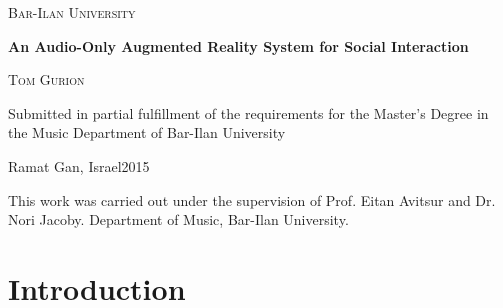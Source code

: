\documentclass[a4paper,11pt]{article}
\begin{document}

\begin{titlepage}
	\centering
	{\LARGE\scshape Bar-Ilan University\par}
	\vspace{2cm}
	{\LARGE\bfseries An Audio-Only Augmented Reality System for Social Interaction\par}
  \vspace{2cm}
  {\large\scshape Tom Gurion\par}
  \vspace{2cm}
	Submitted in partial fulfillment of the requirements for the Master's Degree in the Music Department of Bar-Ilan University\par
	\vfill  %
	Ramat Gan, Israel\hfill 2015
\end{titlepage}

\begin{titlepage}
  This work was carried out under the supervision of Prof. Eitan Avitsur and Dr. Nori Jacoby. Department of Music, Bar-Ilan University.
\end{titlepage}

\tableofcontents

\clearpage
{}  %
{}
\begin{abstract}
Music plays a crucial role in social interactions.
This thesis examines how an interactive environment might facilitate such exchanges by developing and evaluating a novel system for joint music consumption by a group of users in the same place and time.
The system provides a platform for the creation of spatial interactive music.
It uses relative locations measured using a Bluetooth signal, and generates an immersive personalized augmented musical environment that depends on the location of its participants.
I conducted two experiments testing the system within the context of a silent disco party, using the system's relative position signals as well as video tracking to evaluate the experience of users with and without prior acquaintance.
The results showed that for both groups, the system promoted openness and increased the social interaction between users.
\end{abstract}

\clearpage\section{Introduction}
\end{document}
